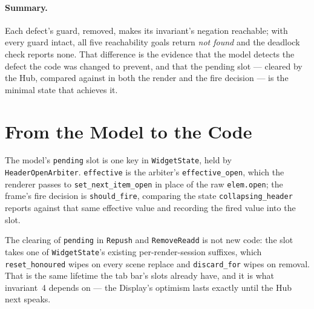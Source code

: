 \documentclass[a4paper,10pt,fleqn]{article}
\begin{document}
\paragraph{Summary.}
Each defect's guard, removed, makes its invariant's negation reachable; with
every guard intact, all five reachability goals return \emph{not found} and the
deadlock check reports none.  That difference is the evidence that the model
detects the defect the code was changed to prevent, and that the pending slot
--- cleared by the Hub, compared against in both the render and the fire
decision --- is the minimal state that achieves it.

\section{From the Model to the Code}

The model's \texttt{pending} slot is one key in \texttt{WidgetState}, held by
\texttt{HeaderOpenArbiter}.  \texttt{effective} is the arbiter's
\texttt{effective\_open}, which the renderer passes to
\texttt{set\_next\_item\_open} in place of the raw \texttt{elem.open}; the
frame's fire decision is \texttt{should\_fire}, comparing the state
\texttt{collapsing\_header} reports against that same effective value and
recording the fired value into the slot.

The clearing of \texttt{pending} in \texttt{Repush} and \texttt{RemoveReadd} is
not new code: the slot takes one of \texttt{WidgetState}'s existing
per-render-session suffixes, which \texttt{reset\_honoured} wipes on every
scene replace and \texttt{discard\_for} wipes on removal.  That is the same
lifetime the tab bar's slots already have, and it is what invariant~4 depends
on --- the Display's optimism lasts exactly until the Hub next speaks.
\end{document}
